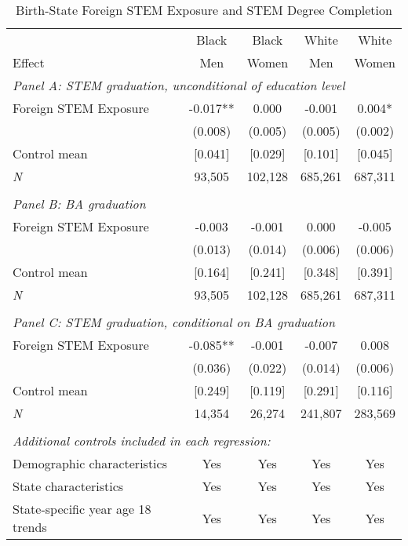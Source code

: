 \begin{table}[ht]
\caption{Birth-State Foreign STEM Exposure and STEM Degree Completion}
\label{tab:STEMgradUncond}
\centering
\begin{threeparttable}
\begin{tabular}{lcccc}
\toprule 
       & Black           & Black        & White        & White       \\
Effect & Men             & Women        & Men          & Women       \\
\midrule 
\multicolumn{5}{l}{\emph{Panel A: STEM graduation, unconditional of education level}}\\ 
Foreign STEM Exposure & -0.017** & 0.000  & -0.001  & 0.004* \\ 
 &  (0.008) & (0.005) & (0.005) & (0.002) \\ 
Control mean &  [0.041] & [0.029] & [0.101] & [0.045] \\ 
\emph{N} &     93,505 &   102,128 &   685,261 &   687,311 \\ 
&&&&\\
\multicolumn{5}{l}{\emph{Panel B: BA graduation}}\\ 
Foreign STEM Exposure & -0.003  & -0.001  & 0.000  & -0.005  \\ 
 &  (0.013) & (0.014) & (0.006) & (0.006) \\ 
Control mean &  [0.164] & [0.241] & [0.348] & [0.391] \\ 
\emph{N} &     93,505 &   102,128 &   685,261 &   687,311 \\ 
&&&&\\
\multicolumn{5}{l}{\emph{Panel C: STEM graduation, conditional on BA graduation}}\\ 
Foreign STEM Exposure & -0.085** & -0.001  & -0.007  & 0.008  \\ 
 &  (0.036) & (0.022) & (0.014) & (0.006) \\ 
Control mean &  [0.249] & [0.119] & [0.291] & [0.116] \\ 
\emph{N} &     14,354 &    26,274 &   241,807 &   283,569 \\ 
&&&&\\
\multicolumn{5}{l}{\emph{Additional controls included in each regression:}}\\ 
Demographic characteristics       & Yes    & Yes & Yes & Yes \\
State characteristics             & Yes    & Yes & Yes & Yes \\
State-specific year age 18 trends & Yes    & Yes & Yes & Yes \\

\end{tabular}
\end{threeparttable}
\end{table}
